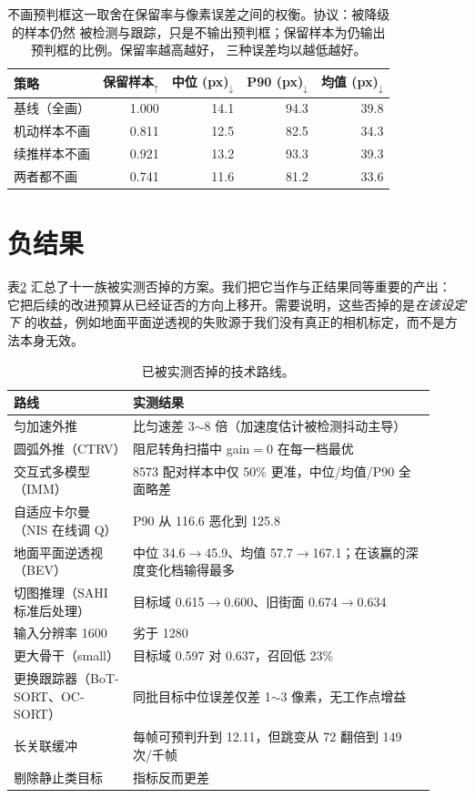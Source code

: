 \documentclass[11pt,a4paper]{ctexart}
\begin{document}
\begin{table}[t]\centering\small
\caption{不画预判框这一取舍在保留率与像素误差之间的权衡。协议：被降级的样本仍然
被检测与跟踪，只是不输出预判框；保留样本为仍输出预判框的比例。保留率越高越好，
三种误差均以越低越好。}
\label{tab:withhold}
\begin{tabular}{lrrrr}
\toprule
策略 & 保留样本$_{\uparrow}$ & 中位 (px)$_{\downarrow}$ & P90 (px)$_{\downarrow}$ & 均值 (px)$_{\downarrow}$ \\
\midrule
基线（全画） & 1.000 & 14.1 & 94.3 & 39.8 \\
机动样本不画 & 0.811 & 12.5 & 82.5 & 34.3 \\
续推样本不画 & 0.921 & 13.2 & 93.3 & 39.3 \\
两者都不画 & 0.741 & 11.6 & 81.2 & 33.6 \\
\bottomrule
\end{tabular}
\end{table}

\section{负结果}
\label{sec:negative}

表\ref{tab:neg} 汇总了十一族被实测否掉的方案。我们把它当作与正结果同等重要的产出：
它把后续的改进预算从已经证否的方向上移开。需要说明，这些否掉的是\emph{在该设定下}
的收益，例如地面平面逆透视的失败源于我们没有真正的相机标定，而不是方法本身无效。

\begin{table}[t]\centering\small
\caption{已被实测否掉的技术路线。}
\label{tab:neg}
\begin{tabular}{p{0.26\linewidth}p{0.66\linewidth}}
\toprule
路线 & 实测结果 \\
\midrule
匀加速外推 & 比匀速差 3$\sim$8 倍（加速度估计被检测抖动主导） \\
圆弧外推（CTRV） & 阻尼转角扫描中 gain$=0$ 在每一档最优 \\
交互式多模型（IMM） & 8573 配对样本中仅 50\% 更准，中位/均值/P90 全面略差 \\
自适应卡尔曼（NIS 在线调 Q） & P90 从 116.6 恶化到 125.8 \\
地面平面逆透视（BEV） & 中位 34.6$\rightarrow$45.9、均值 57.7$\rightarrow$167.1；在该赢的深度变化档输得最多 \\
切图推理（SAHI 标准后处理） & 目标域 0.615$\rightarrow$0.600、旧街面 0.674$\rightarrow$0.634 \\
输入分辨率 1600 & 劣于 1280 \\
更大骨干（small） & 目标域 0.597 对 0.637，召回低 23\% \\
更换跟踪器（BoT-SORT、OC-SORT） & 同批目标中位误差仅差 1$\sim$3 像素，无工作点增益 \\
长关联缓冲 & 每帧可预判升到 12.11，但跳变从 72 翻倍到 149 次/千帧 \\
剔除静止类目标 & 指标反而更差 \\
\bottomrule
\end{tabular}
\end{table}
\end{document}
